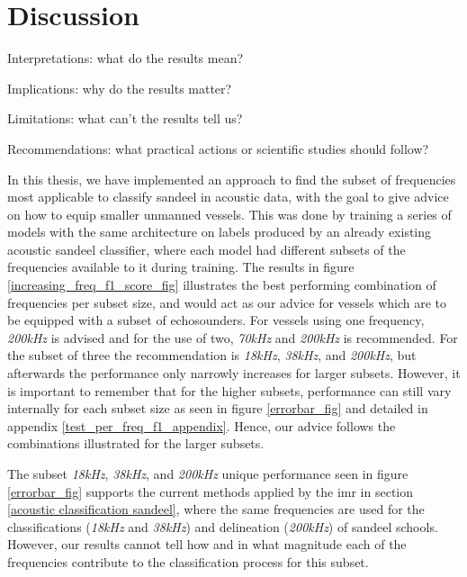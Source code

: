 \chapter{Discussion}
    
    Interpretations: what do the results mean?
    
    Implications: why do the results matter?
    
    Limitations: what can’t the results tell us?
    
    Recommendations: what practical actions or scientific studies should follow?
    
    In this thesis, we have implemented an approach to find the subset of frequencies most applicable to classify sandeel in acoustic data, with the goal to give advice on how to equip smaller unmanned vessels. This was done by training a series of models with the same architecture on labels produced by an already existing acoustic sandeel classifier, where each model had different subsets of the frequencies available to it during training. The results in figure  \ref{increasing_freq_f1_score_fig} illustrates the best performing combination of frequencies per subset size, and would act as our advice for vessels which are to be equipped with a subset of echosounders.  For vessels using one frequency, \textit{200kHz} is advised and for the use of two, \textit{70kHz} and \textit{200kHz} is recommended. For the subset of three the recommendation is \textit{18kHz}, \textit{38kHz}, and \textit{200kHz}, but afterwards the performance only narrowly increases for larger subsets. However, it is important to remember that for the higher subsets, performance can still vary internally for each subset size as seen in figure \ref{errorbar_fig} and detailed in appendix \ref{test_per_freq_f1_appendix}. Hence, our advice follows the combinations illustrated for the larger subsets. 
    

    
    The subset \textit{18kHz}, \textit{38kHz}, and \textit{200kHz} unique performance seen in figure \ref{errorbar_fig} supports the current methods applied by the \gls{imr} in section \ref{acoustic classification sandeel}, where the same frequencies are used for the classifications (\textit{18kHz} and \textit{38kHz}) and delineation (\textit{200kHz}) of sandeel schools. However, our results cannot tell how and in what magnitude each of the frequencies contribute to the classification process for this subset.
    
